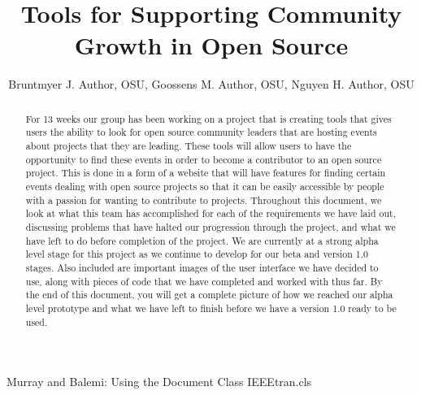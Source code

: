 \documentclass[letterpaper,10pt,onecolumn]{IEEEtran} %
\begin{document}
\title{Tools for Supporting Community Growth in Open Source } %

\author{Bruntmyer J. Author, OSU, Goossens M. Author, OSU, Nguyen H. Author, OSU}

{Murray and Balemi: Using the Document Class IEEEtran.cls} %


\maketitle

\begin{abstract}
For 13 weeks our group has been working on a project that is creating tools that gives users the ability to look for open source community leaders that are hosting events about projects that they are leading. These tools will allow users to have the opportunity to find these events in order to become a contributor to an open source project. This is done in a form of a website that will have features for finding certain events dealing with open source projects so that it can be easily accessible by people with a passion for wanting to contribute to projects. Throughout this document, we look at what this team has accomplished for each of the requirements we have laid out, discussing problems that have halted our progression through the project, and what we have left to do before completion of the project. We are currently at a strong alpha level stage for this project as we continue to develop for our beta and version 1.0 stages. Also included are important images of the user interface we have decided to use, along with pieces of code that we have completed and worked with thus far. By the end of this document, you will get a complete picture of how we reached our alpha level prototype and what we have left to finish before we have a version 1.0 ready to be used.
\end{abstract}
\end{document}
